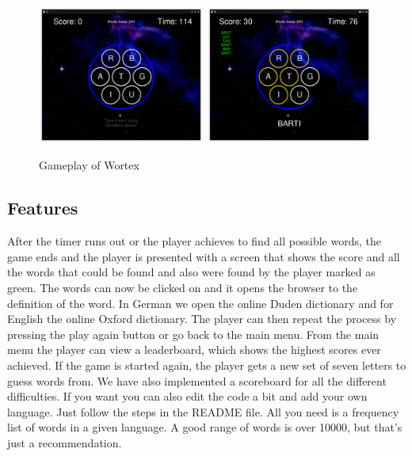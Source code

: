 \documentclass{article}[12pt]
\begin{document}
    
    \begin{figure}[ht]
        \includegraphics[width=0.49\textwidth]{pictures/gameplay.png}
        \includegraphics[width=0.49\textwidth]{pictures/mid_game.png}
        \caption{Gameplay of Wortex}
    \end{figure}

    \subsection*{Features}
    
    After the timer runs out or the player achieves to find all possible words,
    the game ends and the player is presented with a screen that shows the
    score and all the words that could be found and also were found by the
    player marked as green. The words can now be clicked on and it opens the
    browser to the definition of the word. In German we open the online Duden
    dictionary and for English the online Oxford dictionary. The player can
    then repeat the process by pressing the play again button or go back to the
    main menu. From the main menu the player can view a leaderboard, which
    shows the highest scores ever achieved. If the game is started again, the
    player gets a new set of seven letters to guess words from.
    We have also implemented a scoreboard for all the different difficulties.
    If you want you can also edit the code a bit and add your own language. Just
    follow the steps in the README file. All you need is a frequency list of
    words in a given language. A good range of words is over 10000, but that's
    just a recommendation.
\end{document}
